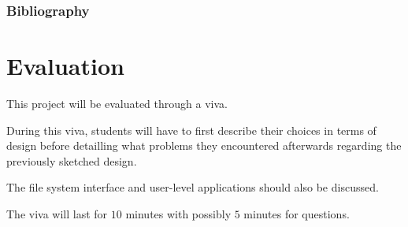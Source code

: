 %
%

\begin{frame}
  \frametitle{Bibliography}

  
  
\end{frame}




%
%

\section{Evaluation}

This project will be evaluated through a viva.

During this viva, students will have to first describe their choices in
terms of design before detailling what problems they encountered afterwards
regarding the previously sketched design.

The file system interface and user-level applications should also be discussed.

The viva will last for $10$ minutes with possibly $5$ minutes for questions.
